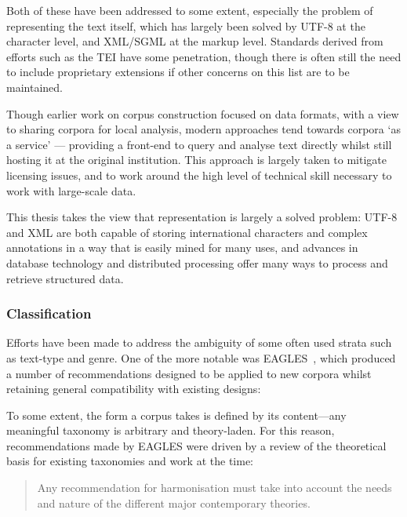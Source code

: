 Both of these have been addressed to some extent, especially the problem of representing the text itself, which has largely been solved by UTF-8 at the character level, and XML/SGML at the markup level.  Standards derived from efforts such as the TEI\cite{ide1995tei} have some penetration, though there is often still the need to include proprietary extensions if other concerns on this list are to be maintained.

Though earlier work on corpus construction focused on data formats\cite{atkins1992corpus,EagTcwgCtypeaglespreliminary}, with a view to sharing corpora for local analysis, modern approaches tend towards corpora `as a service'\cite{hardie2012cqpweb,ferraresi2008introducing} --- providing a front-end to query and analyse text directly whilst still hosting it at the original institution.  This approach is largely taken to mitigate licensing issues, and to work around the high level of technical skill necessary to work with large-scale data.

This thesis takes the view that representation is largely a solved problem: UTF-8 and XML are both capable of storing international characters and complex annotations in a way that is easily mined for many uses, and advances in database technology and distributed processing offer many ways to process and retrieve structured data.




\subsubsection{Classification}
Efforts have been made to address the ambiguity of some often used strata such as text-type and genre.  One of the more notable was EAGLES~\cite{EagTcwgCtypeaglespreliminary}, which produced a number of recommendations designed to be applied to new corpora whilst retaining general compatibility with existing designs:


To some extent, the form a corpus takes is defined by its content---any meaningful taxonomy is arbitrary and theory-laden.  For this reason, recommendations made by EAGLES were driven by a review of the theoretical basis for existing taxonomies and work at the time:

\begin{quote}
Any recommendation for harmonisation must take into account the needs and nature of the different major contemporary theories.
\end{quote}

